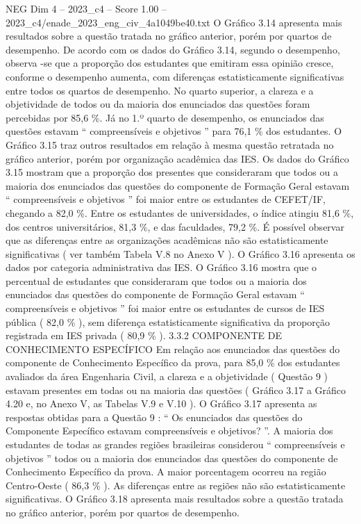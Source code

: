 \begin{textsample}{NEG Dim 4 – 2023\_c4 – Score 1.00 – 2023\_c4/enade\_2023\_eng\_civ\_4a1049be40.txt}
O Gráfico 3.14 apresenta mais resultados sobre a questão tratada no gráfico anterior, porém por quartos de desempenho.
De acordo com os dados do Gráfico 3.14, segundo o desempenho, observa -se que a proporção dos estudantes que emitiram essa opinião cresce, conforme o desempenho aumenta, com diferenças estatisticamente significativas entre todos os quartos de desempenho.
No quarto superior, a clareza e a objetividade de todos ou da maioria dos enunciados das questões foram percebidas por 85,6 \%.
Já no 1.º quarto de desempenho, os enunciados das questões estavam “ compreensíveis e objetivos ” para 76,1 \% dos estudantes.
O Gráfico 3.15 traz outros resultados em relação à mesma questão retratada no gráfico anterior, porém por organização acadêmica das IES.
Os dados do Gráfico 3.15 mostram que a proporção dos presentes que consideraram que todos ou a maioria dos enunciados das questões do componente de Formação Geral estavam “ compreensíveis e objetivos ” foi maior entre os estudantes de CEFET/IF, chegando a 82,0 \%.
Entre os estudantes de universidades, o índice atingiu 81,6 \%, dos centros universitários, 81,3 \%, e das faculdades, 79,2 \%.
É possível observar que as diferenças entre as organizações acadêmicas não são estatisticamente significativas ( ver também Tabela V.8 no Anexo V ).
O Gráfico 3.16 apresenta os dados por categoria administrativa das IES.
O Gráfico 3.16 mostra que o percentual de estudantes que consideraram que todos ou a maioria dos enunciados das questões do componente de Formação Geral estavam “ compreensíveis e objetivos ” foi maior entre os estudantes de cursos de IES pública ( 82,0 \% ), sem diferença estatisticamente significativa da proporção registrada em IES privada ( 80,9 \% ). 3.3.2 COMPONENTE DE CONHECIMENTO ESPECÍFICO Em relação aos enunciados das questões do componente de Conhecimento Específico da prova, para 85,0 \% dos estudantes avaliados da área Engenharia Civil, a clareza e a objetividade ( Questão 9 ) estavam presentes em todas ou na maioria das questões ( Gráfico 3.17 a Gráfico 4.20 e, no Anexo V, as Tabelas V.9 e V.10 ).
O Gráfico 3.17 apresenta as respostas obtidas para a Questão 9 : “ Os enunciados das questões do Componente Específico estavam compreensíveis e objetivos? ”.
A maioria dos estudantes de todas as grandes regiões brasileiras considerou “ compreensíveis e objetivos ” todos ou a maioria dos enunciados das questões do componente de Conhecimento Específico da prova.
A maior porcentagem ocorreu na região Centro-Oeste ( 86,3 \% ).
As diferenças entre as regiões não são estatisticamente significativas.
O Gráfico 3.18 apresenta mais resultados sobre a questão tratada no gráfico anterior, porém por quartos de desempenho.

\end{textsample}
